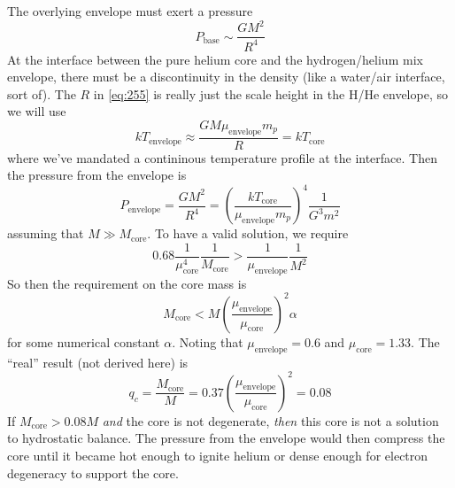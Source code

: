 \documentclass[10pt]{article}
\numberwithin{equation}{section}
\begin{document}
    The overlying envelope must exert a pressure
    \begin{equation}
      \label{eq:255}
      P_{\mathrm{base}}\sim\frac{GM^2}{R^4}
    \end{equation}
    At the interface between the pure helium core and the
    hydrogen/helium mix envelope, there must be a discontinuity in the
    density (like a water/air interface, sort of). The $R$ in
    \eqref{eq:255} is really just the scale height in the H/He
    envelope, so we will use
    \begin{equation}
      \label{eq:256}
      kT_{\mathrm{envelope}}\approx\frac{GM\mu_{\mathrm{envelope}}m_p}{R}
=kT_{\mathrm{core}}
    \end{equation}
    where we've mandated a contininous temperature profile at the
    interface. Then the pressure from the envelope is
    \begin{equation}
      \label{eq:257}
      P_{\mathrm{envelope}}=\frac{GM^2}{R^4}=\left(\frac{kT_{\mathrm
{core}}}{\mu_{\mathrm{envelope}}m_p}\right)^4\frac{1}{G^3m^2}
    \end{equation}
    assuming that $M\gg M_{\mathrm{core}}$. To have a valid solution,
    we require
    \begin{equation}
      \label{eq:258}
      0.68\frac{1}{\mu_{\mathrm{core}}^4}\frac{1}{M_{\mathrm{core}}}>\frac
{1}{\mu_{\mathrm{envelope}}}\frac{1}{M^2}
    \end{equation}
    So then the requirement on the core mass is
    \begin{equation}
      \label{eq:259}
      M_{\mathrm{core}}<M\left(\frac{\mu_{\mathrm{envelope}}}{\mu_{\mathrm
{core}}}\right)^2\alpha
    \end{equation}
    for some numerical constant $\alpha$. Noting that
    $\mu_{\mathrm{envelope}}=0.6$ and $\mu_{\mathrm{core}}=1.33$. The
    ``real'' result (not derived here) is
    \begin{equation}
      \label{eq:260}
      q_c=\frac{M_{\mathrm{core}}}{M}=0.37\left(\frac{\mu_{\mathrm
{envelope}}}{\mu_{\mathrm{core}}}\right)^2=0.08
    \end{equation}
    If $M_{\mathrm{core}}>0.08M$ \emph{and} the core is not degenerate,
    \emph{then} this core is not a solution to hydrostatic balance. The
    pressure from the envelope would then compress the core until it became hot
    enough to ignite helium or dense enough for electron degeneracy to support
    the core.\\
\end{document}

